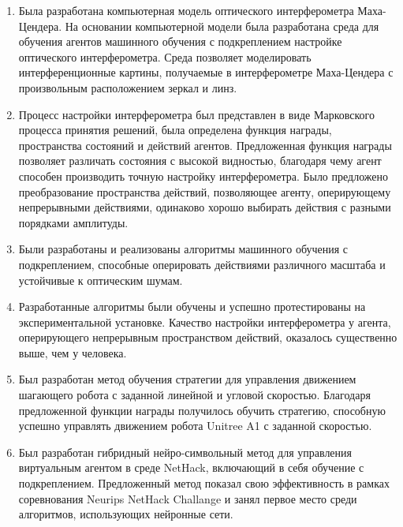 \begin{enumerate}
  \item Была разработана компьютерная модель оптического интерферометра Маха-Цендера. На основании компьютерной модели была разработана среда для обучения агентов машинного обучения с подкреплением настройке оптического интерферометра. Среда позволяет моделировать интерференционные картины, получаемые в интерферометре Маха-Цендера с произвольным расположением зеркал и линз. 
  \item Процесс настройки интерферометра был представлен в виде Марковского процесса принятия решений, была определена функция награды, пространства состояний и действий агентов. Предложенная функция награды позволяет различать состояния с высокой видностью, благодаря чему агент способен производить точную настройку интерферометра. Было предложено преобразование пространства действий, позволяющее агенту, оперирующему непрерывными действиями, одинаково хорошо выбирать действия с разными порядками амплитуды. 
  \item Были разработаны и реализованы алгоритмы машинного обучения с подкреплением, способные оперировать действиями различного масштаба и устойчивые к оптическим шумам. 
  \item Разработанные алгоритмы были обучены и успешно протестированы на экспериментальной установке. Качество настройки интерферометра у агента, оперирующего непрерывным пространством действий, оказалось существенно выше, чем у человека. 
  \item Был разработан метод обучения стратегии для управления движением шагающего робота с заданной линейной и угловой скоростью. Благодаря предложенной функции награды получилось обучить стратегию, способную успешно управлять движением робота Unitree A1 с заданной скоростью. 
  \item Был разработан гибридный нейро-символьный метод для управления виртуальным агентом в среде NetHack, включающий в себя обучение с подкреплением. Предложенный метод показал свою эффективность в рамках соревнования Neurips NetHack Challange и занял первое место среди алгоритмов, использующих нейронные сети.
\end{enumerate}

\newpage
